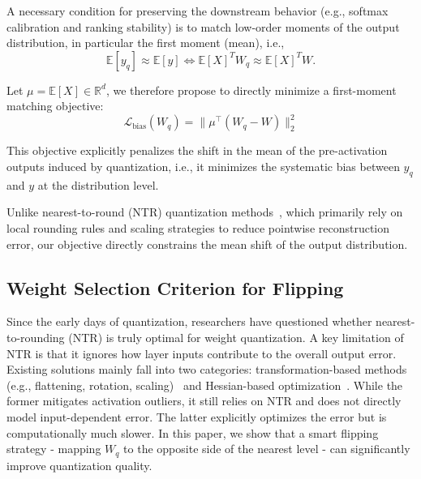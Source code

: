 \documentclass[table, 11pt]{article}
\begin{document}
A necessary condition for preserving the downstream behavior (e.g., softmax calibration and ranking stability) is to match low-order moments of the output distribution, in particular the first moment (mean), i.e.,
\begin{equation}
    \mathbb{E}[y_q] \approx \mathbb{E}[y]
    \Leftrightarrow 
    \mathbb{E}[X]^T W_q \approx \mathbb{E}[X]^T W.
\end{equation}

Let $\mu = \mathbb{E}[X] \in \mathbb{R}^d$, we therefore propose to directly minimize a first-moment matching objective:
\begin{equation}
\mathcal{L}_{\text{bias}}(W_q)
=
\big\|
\mu^{\top}(W_q - W)
\big\|_2^2
\label{eq:bias-obj}
\end{equation}


This objective explicitly penalizes the shift in the mean of the pre-activation outputs induced by quantization, i.e., it minimizes the systematic bias between $y_q$ and $y$ at the distribution level.

Unlike nearest-to-round (NTR) quantization methods~\cite{smoothquant2023, MLSYS2024_awq}, which primarily rely on local rounding rules and scaling strategies to reduce pointwise reconstruction error, our objective directly constrains the mean shift of the output distribution.



\subsection{Weight Selection Criterion for Flipping}\label{sec:flip-cri}

Since the early days of quantization, researchers have questioned whether nearest-to-rounding (NTR) is truly optimal for weight quantization. A key limitation of NTR is that it ignores how layer inputs contribute to the overall output error. Existing solutions mainly fall into two categories: transformation-based methods (e.g., flattening, rotation, scaling)~\cite{smoothquant2023, MLSYS2024_awq, flatquant2025} and Hessian-based optimization~\cite{OBQ2022, frantar2023optq}. While the former mitigates activation outliers, it still relies on NTR and does not directly model input-dependent error. The latter explicitly optimizes the error but is computationally much slower. In this paper, we show that a smart flipping strategy - mapping $W_q$ to the opposite side of the nearest level - can significantly improve quantization quality.
\end{document}
